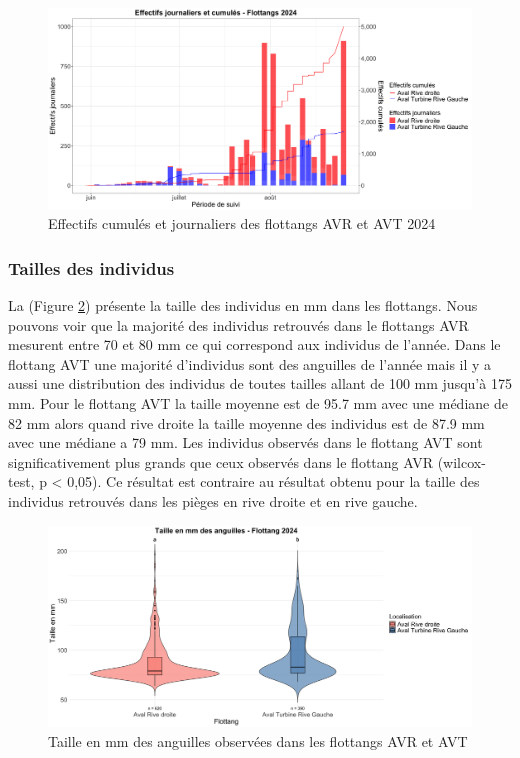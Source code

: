 \documentclass[11pt,titlepage,twoside]{article}\usepackage[]{graphicx}\usepackage[table]{xcolor}
\begin{document}
\begin{figure}[htpb]
\centering
\includegraphics[width=\textwidth]{graph_flottang_oral.png}
\caption{Effectifs cumulés et journaliers des flottangs AVR et AVT 2024}
\label{graph_flottang_oral}
\end{figure} 

\subsubsection{Tailles des individus}

La (Figure \ref{taille_flottang_oral}) présente la taille des individus en mm dans les flottangs. Nous pouvons voir que la majorité des individus retrouvés dans le flottangs AVR mesurent entre 70 et 80 mm ce qui correspond aux individus de l’année. Dans le flottang AVT une majorité d’individus sont des anguilles de l’année mais il y a aussi une distribution des individus de toutes tailles allant de 100 mm jusqu’à 175 mm. Pour le flottang AVT la taille moyenne est de 95.7 mm avec une médiane de 82 mm alors quand rive droite la taille moyenne des individus est de 87.9 mm avec une médiane a 79 mm. Les individus observés dans le flottang AVT sont significativement plus grands que ceux observés dans le flottang AVR (wilcox-test, p < 0,05). Ce résultat est contraire au résultat obtenu pour la taille des individus retrouvés dans les pièges en rive droite et en rive gauche.

\begin{figure}[htpb]
\centering
\includegraphics[width=\textwidth]{taille_flottang_oral.png}
\caption{Taille en mm des anguilles observées dans les flottangs AVR et AVT}
\label{taille_flottang_oral}
\end{figure} 
\end{document}
